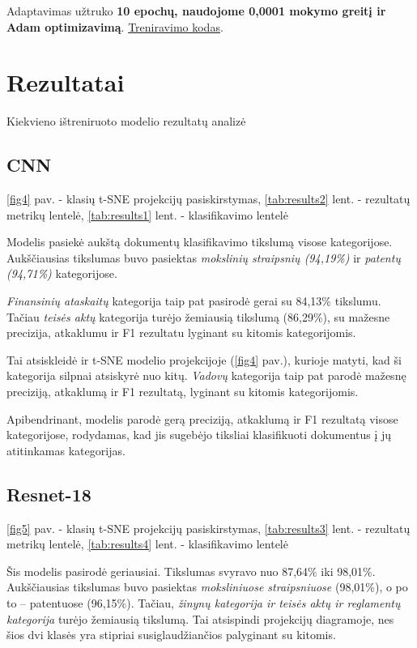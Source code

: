 \documentclass[conference]{IEEEtran}
\begin{document}
Adaptavimas užtruko \textbf{10 epochų, naudojome 0,0001 mokymo greitį ir Adam optimizavimą}. \href{https://github.com/VU-MIF-SE/komandine-uzduotis-jje/blob/main/ViT.ipynb}{Treniravimo kodas}.

\section{Rezultatai}
Kiekvieno ištreniruoto modelio rezultatų analizė

\subsection{CNN}
\ref{fig4} pav. - klasių t-SNE projekcijų pasiskirstymas, \ref{tab:results2} lent. - rezultatų metrikų lentelė, \ref{tab:results1} lent. - klasifikavimo lentelė

Modelis pasiekė aukštą dokumentų klasifikavimo tikslumą visose kategorijose. Aukščiausias tikslumas buvo pasiektas \textit{mokslinių straipsnių (94,19\%)} ir \textit{patentų (94,71\%)} kategorijose. 

\textit{Finansinių ataskaitų} kategorija taip pat pasirodė gerai su 84,13\% tikslumu. Tačiau \textit{teisės aktų} kategorija turėjo žemiausią tikslumą (86,29\%), su mažesne precizija, atkaklumu ir F1 rezultatu lyginant su kitomis kategorijomis. 

Tai atsiskleidė ir t-SNE modelio projekcijoje (\ref{fig4} pav.), kurioje matyti, kad ši kategorija silpnai atsiskyrė nuo kitų. \textit{Vadovų} kategorija taip pat parodė mažesnę preciziją, atkaklumą ir F1 rezultatą, lyginant su kitomis kategorijomis. 

Apibendrinant, modelis parodė gerą preciziją, atkaklumą ir F1 rezultatą visose kategorijose, rodydamas, kad jis sugebėjo tiksliai klasifikuoti dokumentus į jų atitinkamas kategorijas.

\subsection{Resnet-18}
\ref{fig5} pav. - klasių t-SNE projekcijų pasiskirstymas, \ref{tab:results3} lent. - rezultatų metrikų lentelė, \ref{tab:results4} lent. - klasifikavimo lentelė 

Šis modelis pasirodė geriausiai. Tikslumas svyravo nuo 87,64\% iki 98,01\%. Aukščiausias tikslumas buvo pasiektas \textit{moksliniuose straipsniuose} (98,01\%), o po to -- patentuose (96,15\%). Tačiau, \textit{žinynų kategorija ir teisės aktų ir reglamentų kategorija} turėjo žemiausią tikslumą. Tai atsispindi projekcijų diagramoje, nes šios dvi klasės yra stipriai susiglaudžiančios palyginant su kitomis.
\end{document}
